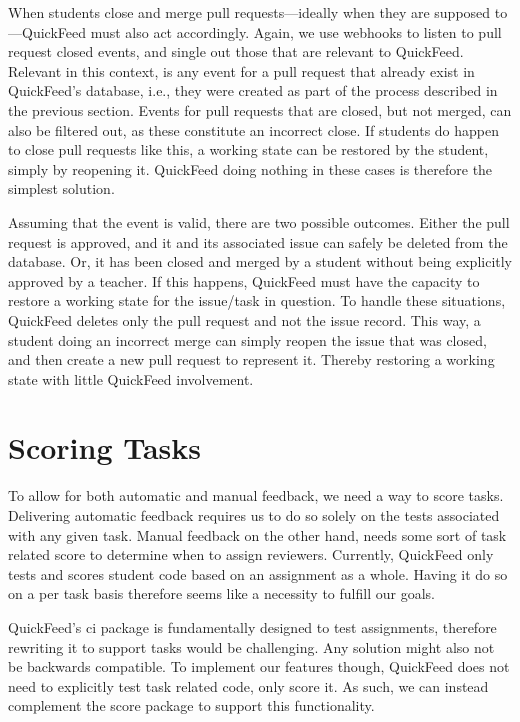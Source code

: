 When students close and merge pull requests---ideally when they are supposed to---QuickFeed must also act accordingly.
Again, we use webhooks to listen to pull request closed events, and single out those that are relevant to QuickFeed.
Relevant in this context, is any event for a pull request that already exist in QuickFeed's database, i.e., they were created as part of the process described in the previous section.
Events for pull requests that are closed, but not merged, can also be filtered out, as these constitute an incorrect close.
If students do happen to close pull requests like this, a working state can be restored by the student, simply by reopening it.
QuickFeed doing nothing in these cases is therefore the simplest solution.

Assuming that the event is valid, there are two possible outcomes.
Either the pull request is approved, and it and its associated issue can safely be deleted from the database.
Or, it has been closed and merged by a student without being explicitly approved by a teacher.
If this happens, QuickFeed must have the capacity to restore a working state for the issue/task in question.
To handle these situations, QuickFeed deletes only the pull request and not the issue record.
This way, a student doing an incorrect merge can simply reopen the issue that was closed, and then create a new pull request to represent it.
Thereby restoring a working state with little QuickFeed involvement.

\section{Scoring Tasks}

To allow for both automatic and manual feedback, we need a way to score tasks.
Delivering automatic feedback requires us to do so solely on the tests associated with any given task.
Manual feedback on the other hand, needs some sort of task related score to determine when to assign reviewers.
Currently, QuickFeed only tests and scores student code based on an assignment as a whole.
Having it do so on a per task basis therefore seems like a necessity to fulfill our goals.

QuickFeed's ci package is fundamentally designed to test assignments, therefore rewriting it to support tasks would be challenging.
Any solution might also not be backwards compatible.
To implement our features though, QuickFeed does not need to explicitly test task related code, only score it.
As such, we can instead complement the score package to support this functionality.

